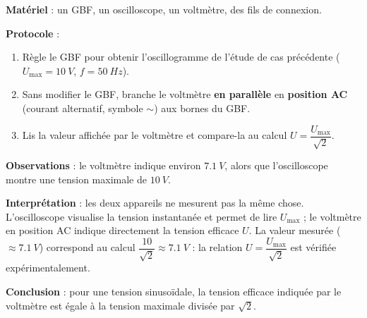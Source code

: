 \documentclass[11pt]{article}
\newcommand{\cle}[1]{{\popxbold\color{popdark}#1}}
\begin{document}
\begin{experience}
\textbf{Matériel} : un GBF, un oscilloscope, un voltmètre, des fils de connexion.

\textbf{Protocole} :
\begin{enumerate}
\item Règle le GBF pour obtenir l'oscillogramme de l'étude de cas précédente ($U_{\text{max}} = \SI{10}{V}$, $f = \SI{50}{Hz}$).
\item Sans modifier le GBF, branche le voltmètre \textbf{en parallèle} en \textbf{position AC} (courant alternatif, symbole $\sim$) aux bornes du GBF.
\item Lis la valeur affichée par le voltmètre et compare-la au calcul $U = \dfrac{U_{\text{max}}}{\sqrt{2}}$.
\end{enumerate}

\textbf{Observations} : le voltmètre indique environ $\SI{7,1}{V}$, alors que l'oscilloscope montre une tension maximale de $\SI{10}{V}$.

\textbf{Interprétation} : les deux appareils ne mesurent pas la même chose. L'oscilloscope visualise la tension instantanée et permet de lire $U_{\text{max}}$ ; le voltmètre en position AC indique directement la \cle{tension efficace} $U$. La valeur mesurée ($\approx \SI{7,1}{V}$) correspond au calcul $\dfrac{10}{\sqrt{2}} \approx \SI{7,1}{V}$ : la relation $U = \dfrac{U_{\text{max}}}{\sqrt{2}}$ est vérifiée expérimentalement.

\textbf{Conclusion} : pour une tension sinusoïdale, la tension efficace indiquée par le voltmètre est égale à la tension maximale divisée par $\sqrt{2}$.
\end{experience}
\end{document}
